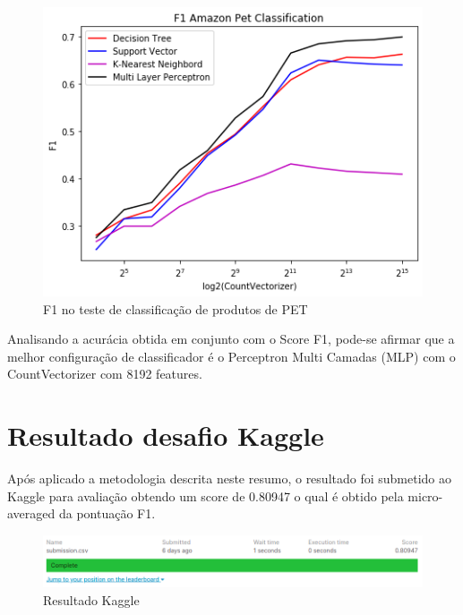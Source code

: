 \documentclass[conference]{IEEEtran}
\begin{document}
%	

	\begin{figure}[H]
		\centering
		\includegraphics[width=\linewidth]{Images/F1}
		\caption{F1 no teste de classificação de produtos de PET}
		\label{fig:f1}
	\end{figure}


Analisando a acurácia obtida em conjunto com o Score F1, pode-se afirmar que a melhor configuração de classificador é o Perceptron Multi Camadas (MLP) com o CountVectorizer com 8192 features.

\section{Resultado desafio Kaggle}

Após aplicado a metodologia descrita neste resumo, o resultado foi submetido ao Kaggle para avaliação obtendo um score de 0.80947 o qual é obtido pela micro-averaged da pontuação F1.


\begin{figure}[!htb]
	\centering
	\includegraphics[width=\linewidth]{Images/ResultadoKaggle}
	\caption{Resultado Kaggle}
	\label{fig:resultadokaggle}
\end{figure}
\end{document}
